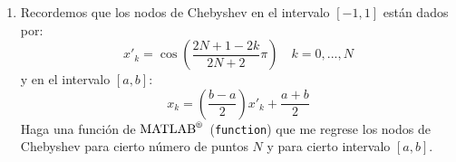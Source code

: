 \documentclass[letterpaper,12pt]{exam}
\newcommand{\matlab}{$\text{MATLAB}^{\text{\textregistered}}$~}
\begin{document}
\begin{enumerate}
 \item Recordemos que los nodos de Chebyshev en el intervalo $[-1,1]$ están dados por:
 \begin{equation}
   x'_k = \cos\left(\frac{2N+1-2k}{2N+2} \pi\right) \quad k=0,...,N
  \end{equation} 
 y en el intervalo $[a,b]$:
 \begin{equation}
   x_k = \left(\frac{b-a}{2}\right)x'_k + \frac{a+b}{2}
 \end{equation}
 Haga una función de \matlab (\texttt{function}) que me regrese los nodos de Chebyshev para cierto número de puntos $N$ y para cierto intervalo $[a,b]$.
\end{enumerate}
\end{document}
